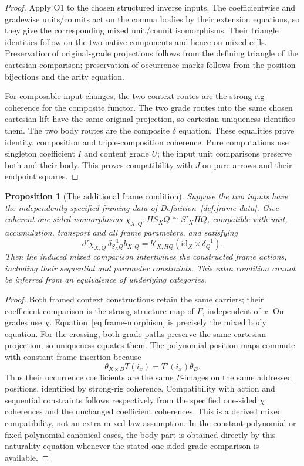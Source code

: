 \documentclass[11pt,a4paper]{article}
\newtheorem{proposition}[theorem]{Proposition}
\theoremstyle{definition}
\newcommand{\id}{\mathrm{id}}
\begin{document}
\begin{proof}
Apply O1 to the chosen structured inverse inputs. The coefficientwise and
gradewise units/counits act on the comma bodies by their extension equations,
so they give the corresponding mixed unit/counit isomorphisms. Their
triangle identities follow on the two native components and hence on mixed
cells. Preservation of original-grade projections follows from the defining
triangle of the cartesian comparison; preservation of occurrence marks
follows from the position bijections and the arity equation.

For composable input changes, the two context routes are the strong-rig
coherence for the composite functor. The two grade routes into the same
chosen cartesian lift have the same original projection, so cartesian
uniqueness identifies them. The two body routes are the composite
$\delta$ equation. These equalities prove identity, composition and
triple-composition coherence. Pure computations use singleton coefficient
$I$ and content grade $U$; the input unit comparisons preserve both and
their body. This proves compatibility with $J$ on pure arrows and their
endpoint squares.
\end{proof}

\begin{proposition}[The additional frame condition]\label{prop:equivalence-frame}
Suppose the two inputs have the independently specified framing data of
Definition~\ref{def:frame-data}. Give coherent one-sided isomorphisms
$\chi_{X,Q}:HS_XQ\cong S'_XHQ$, compatible with unit, accumulation,
transport and all frame parameters, and satisfying
\begin{equation}\label{eq:frame-morphism}
 d'\chi_{X,Q}\,\delta^{-1}_{S_XQ}b_{X,Q}
   =b'_{X,HQ}(\id_X\times\delta_Q^{-1}).
\end{equation}
Then the induced mixed comparison intertwines the constructed frame
actions, including their sequential and parameter constraints. This extra
condition cannot be inferred from an equivalence of underlying categories.
\end{proposition}
\begin{proof}
Both framed context constructions retain the same carriers; their
coefficient comparison is the strong structure map of $F$, independent of
$x$. On grades use $\chi$. Equation~\eqref{eq:frame-morphism} is precisely
the mixed body equation. For the crossing, both grade paths preserve the
same cartesian projection, so uniqueness equates them. The polynomial
position maps commute with constant-frame insertion because
\[
 \theta_{X\times B}T(i_x)=T'(i_x)\theta_B.
\]
Thus their occurrence coefficients are the same $F$-images on the same
addressed positions, identified by strong-rig coherence. Compatibility
with action and sequential constraints follows respectively from the
specified one-sided $\chi$ coherences and the unchanged coefficient
coherences. This is a derived mixed compatibility, not an extra mixed-law
assumption. In the constant-polynomial or fixed-polynomial canonical cases,
the body part is obtained directly by this naturality equation whenever
the stated one-sided grade comparison is available.
\end{proof}
\end{document}
